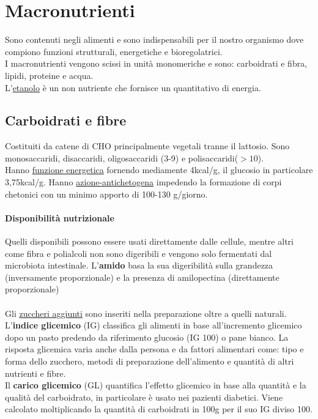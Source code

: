\documentclass[10pt]{article}
\begin{document}
\section{Macronutrienti}
Sono contenuti negli alimenti e sono indispensabili per il nostro organismo dove compiono funzioni strutturali, energetiche e bioregolatrici.\\
I macronutrienti vengono scissi in unità monomeriche e sono: carboidrati e fibra, lipidi, proteine e acqua.\\
L'\underline{etanolo} è un non nutriente che fornisce un quantitativo di energia. 
\subsection{Carboidrati e fibre}
Costituiti da catene di CHO principalmente vegetali tranne il lattosio.
Sono monosaccaridi, disaccaridi, oligosaccaridi (3-9) e polisaccaridi($>10$).\\
Hanno \underline{funzione energetica} fornendo mediamente 4kcal/g, il glucosio in particolare 3,75kcal/g. Hanno \underline{azione-antichetogena} impedendo la formazione di corpi chetonici con un minimo apporto di 100-130 g/giorno. 
\paragraph*{Disponibilità nutrizionale}Quelli disponibili possono essere usati direttamente dalle cellule, mentre altri come fibra e polialcoli non sono digeribili e vengono solo fermentati dal microbiota intestinale. L'\textbf{amido} basa la sua digeribilità sulla grandezza (inversamente proporzionale) e la presenza di amilopectina (direttamente proporzionale) \\
\\
Gli \underline{zuccheri aggiunti} sono inseriti nella preparazione oltre a quelli naturali.\\
L'\textbf{indice glicemico} (IG) classifica gli alimenti in base all'incremento glicemico dopo un pasto predendo da riferimento glucosio (IG 100) o pane bianco. La risposta glicemica varia anche dalla persona e da fattori alimentari come: tipo e forma dello zucchero, metodi di preparazione dell'alimento e quantità di altri nutrienti e fibre. \\
Il \textbf{carico glicemico} (GL) quantifica l'effetto glicemico in base alla quantità e la qualità del carboidrato, in particolare è usato nei pazienti diabetici. Viene calcolato moltiplicando la quantità di carboidrati in 100g per il suo IG diviso 100.
\end{document}
